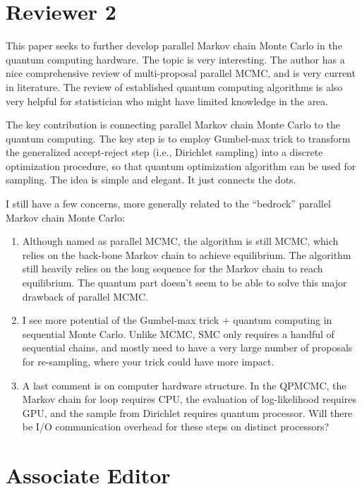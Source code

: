 \documentclass[12pt]{article}
\begin{document}
\section*{Reviewer 2}


This paper seeks to further develop parallel Markov chain Monte Carlo in the quantum computing hardware. The topic is very interesting. The author has a nice comprehensive review of multi-proposal parallel MCMC, and is very current in literature. The review of established quantum computing algorithms is also very helpful for statistician who might have limited knowledge in the area. 

The key contribution is connecting parallel Markov chain Monte Carlo to the quantum computing. The key step is to employ Gumbel-max trick to transform the generalized accept-reject step (i.e., Dirichlet sampling) into a discrete optimization procedure, so that quantum optimization algorithm can be used for sampling. The idea is simple and elegant. It just connects the dots.

I still have a few concerns, more generally related to the “bedrock” parallel Markov chain Monte Carlo:

\begin{enumerate}
	\item Although named as parallel MCMC, the algorithm is still MCMC, which relies on the back-bone Markov chain to achieve equilibrium. The algorithm still heavily relies on the long sequence for the Markov chain to reach equilibrium. The quantum part doesn’t seem to be able to solve this major drawback of parallel MCMC. 
	
	\item I see more potential of the Gumbel-max trick $+$ quantum computing in sequential Monte Carlo. Unlike MCMC, SMC only requires a handful of sequential chains, and mostly need to have a very large number of proposals for re-sampling, where your trick could have more impact.
	
	\item A last comment is on computer hardware structure. In the QPMCMC, the Markov chain for loop requires CPU, the evaluation of log-likelihood requires GPU, and the sample from Dirichlet requires quantum processor. Will there be I/O communication overhead for these steps on distinct processors?
\end{enumerate}






\section*{Associate Editor}
\end{document}
